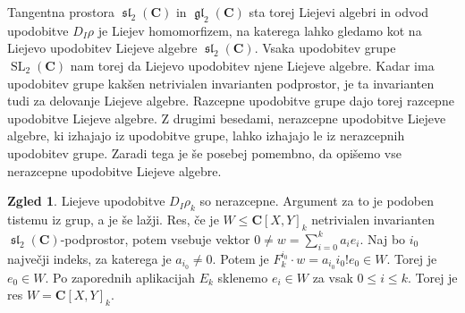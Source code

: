\documentclass[11pt]{book}
\def\CC{\mathbf{C}}
\DeclareMathOperator\glfrak{\mathfrak{gl}}
\DeclareMathOperator\slfrak{\mathfrak{sl}}
\DeclareMathOperator\SL{SL}
\theoremstyle{definition}
\theoremstyle{zgled}
\newtheorem*{zgled}{Zgled}
\theoremstyle{odprtproblem}
\theoremstyle{domacanaloga}
\theoremstyle{izrek}
\begin{document}
Tangentna prostora $\slfrak_2(\CC)$ in $\glfrak_2(\CC)$ sta torej Liejevi algebri in odvod upodobitve $D_I \rho$ je Liejev homomorfizem, na katerega lahko gledamo kot na Liejevo upodobitev Liejeve algebre $\slfrak_2(\CC)$. Vsaka upodobitev grupe $\SL_2(\CC)$ nam torej da Liejevo upodobitev njene Liejeve algebre. Kadar ima upodobitev grupe kakšen netrivialen invarianten podprostor, je ta invarianten tudi za delovanje Liejeve algebre. Razcepne upodobitve grupe dajo torej razcepne upodobitve Liejeve algebre. Z drugimi besedami, nerazcepne upodobitve Liejeve algebre, ki izhajajo iz upodobitve grupe, lahko izhajajo le iz nerazcepnih upodobitev grupe. Zaradi tega je še posebej pomembno, da opišemo vse nerazcepne upodobitve Liejeve algebre.

\begin{zgled}
Liejeve upodobitve $D_I \rho_k$ so nerazcepne. Argument za to je podoben tistemu iz grup, a je še lažji. Res, če je $W \leq \CC[X,Y]_k$ netrivialen invarianten $\slfrak_2(\CC)$-podprostor, potem vsebuje vektor $0 \neq w = \sum_{i = 0}^k a_i e_i$. Naj bo $i_0$ največji indeks, za katerega je $a_{i_0} \neq 0$. Potem je $    F_k^{i_0} \cdot w = a_{i_0} i_0! e_0 \in W$. Torej je $e_0 \in W$. Po zaporednih aplikacijah $E_k$ sklenemo $e_i \in W$ za vsak $0 \leq i \leq k$. Torej je res $W = \CC[X,Y]_k$.
\end{zgled}
\end{document}
